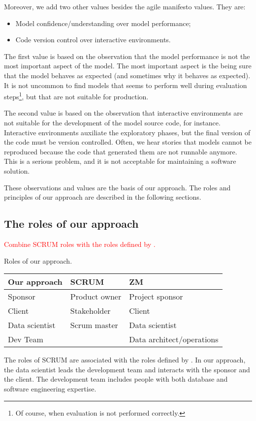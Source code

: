 Moreover, we add two other values besides the agile manifesto values.  They are:
\begin{itemize}
  \item Model confidence/understanding over model performance;
  \item Code version control over interactive environments.
\end{itemize}

The first value is based on the observation that the model performance is not the most
important aspect of the model.  The most important aspect is the being sure that the model
behaves as expected (and sometimes why it behaves as expected).  It is not uncommon to find
models that seems to perform well during evaluation steps\footnote{Of course, when
evaluation is not performed correctly.}, but that are not suitable for production.

The second value is based on the observation that interactive environments are not suitable
for the development of the model source code, for instance.  Interactive environments
auxiliate the exploratory phases, but the final version of the code must be version
controlled.  Often, we hear stories that models cannot be reproduced because the code that
generated them are not runnable anymore.  This is a serious problem, and it is not
acceptable for maintaining a software solution.

These observations and values are the basis of our approach.  The roles and principles of
our approach are described in the following sections.

\subsection{The roles of our approach}

\textcolor{red}{Combine SCRUM roles with the roles defined by \textcite{Zumel2019}.}

\begin{tablebox}[label=tab:roles]{Roles of our approach.}
  \centering
  \begin{tabular}{lll}
    \toprule
    \textbf{Our approach} & \textbf{SCRUM} & \textbf{ZM} \\
    \midrule
    Sponsor & Product owner & Project sponsor \\
    Client & Stakeholder & Client \\
    Data scientist & Scrum master & Data scientist \\
    Dev Team & & Data architect/operations \\
    \bottomrule
  \end{tabular}
  \tcblower
  The roles of SCRUM are associated with the roles defined by \textcite{Zumel2019}.
  In our approach, the data scientist leads the development team and interacts with the sponsor
  and the client.  The development team includes people with both database and software
  engineering expertise.
\end{tablebox}

